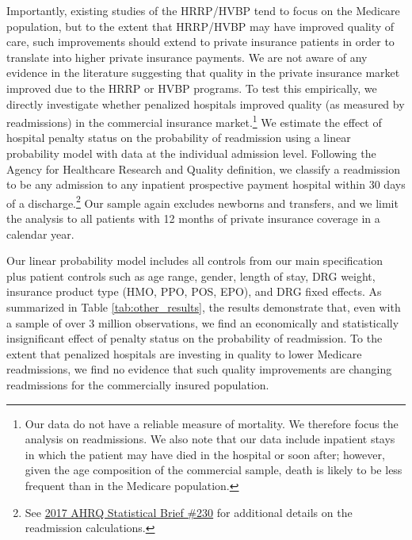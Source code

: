 \documentclass[12pt]{article}
\begin{document}
Importantly, existing studies of the HRRP/HVBP tend to focus on the Medicare population, but to the extent that HRRP/HVBP may have improved quality of care, such improvements should extend to private insurance patients in order to translate into higher private insurance payments. We are not aware of any evidence in the literature suggesting that quality in the private insurance market improved due to the HRRP or HVBP programs. To test this empirically, we directly investigate whether penalized hospitals improved quality (as measured by readmissions) in the commercial insurance market.\footnote{Our data do not have a reliable measure of mortality. We therefore focus the analysis on readmissions. We also note that our data include inpatient stays in which the patient may have died in the hospital or soon after; however, given the age composition of the commercial sample, death is likely to be less frequent than in the Medicare population.} We estimate the effect of hospital penalty status on the probability of readmission using a linear probability model with data at the individual admission level. Following the Agency for Healthcare Research and Quality definition, we classify a readmission to be any admission to any inpatient prospective payment hospital within 30 days of a discharge.\footnote{See \href{https://www.hcup-us.ahrq.gov/reports/statbriefs/sb230-7-Day-Versus-30-Day-Readmissions.jsp?utm_source=ahrq&utm_medium=en1&utm_term=&utm_content=1&utm_campaign=ahrq_en11_7_2017}{2017 AHRQ Statistical Brief \#230} for additional details on the readmission calculations.} Our sample again excludes newborns and transfers, and we limit the analysis to all patients with 12 months of private insurance coverage in a calendar year.

Our linear probability model includes all controls from our main specification plus patient controls such as age range, gender, length of stay, DRG weight, insurance product type (HMO, PPO, POS, EPO), and DRG fixed effects. As summarized in Table \ref{tab:other_results}, the results demonstrate that, even with a sample of over 3 million observations, we find an economically and statistically insignificant effect of penalty status on the probability of readmission. To the extent that penalized hospitals are investing in quality to lower Medicare readmissions, we find no evidence that such quality improvements are changing readmissions for the commercially insured population.
\end{document}
